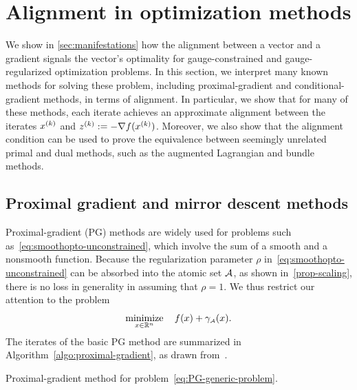 \section{Alignment in optimization methods} \label{sec:methods}

We show in \autoref{sec:manifestations} how the alignment between a vector and a
gradient signals the vector's optimality for gauge-constrained and
gauge-regularized optimization problems. In this section, we interpret many
known methods for solving these problem, including proximal-gradient and
conditional-gradient methods, in terms of alignment. In particular, we show that
for many of these methods, each iterate achieves an approximate alignment
between the iterates $x^{(k)}$ and $z^{(k)} := -\nabla f(x^{(k)})$. Moreover, we also show
that the alignment condition can be used to prove the equivalence between
seemingly unrelated primal and dual methods, such as the augmented Lagrangian
and bundle methods.

\subsection{Proximal gradient and mirror descent methods}

Proximal-gradient (PG) methods \cite{parikh2013proximal,teb97} are widely used
for problems such as~\eqref{eq:smoothopto-unconstrained}, which involve the sum
of a smooth and a nonsmooth function. Because the regularization  parameter
$\rho$ in~\eqref{eq:smoothopto-unconstrained} can be absorbed into the atomic
set $\mathcal{A}$, as shown in~\autoref{prop-scaling}, there is no loss in generality in
assuming that $\rho = 1$. We thus restrict our attention to the problem
\begin{equation} \label{eq:PG-generic-problem}
   \displaystyle\mathop{\hbox{\rm minimize}}_{x\in\mathbb{R}^n}\enspace\enspace f(x) + \gamma_{\scriptscriptstyle\mathcal{A}}(x).
\end{equation}
The iterates of the basic PG method are summarized in
Algorithm~\ref{algo:proximal-gradient}, as drawn
from~\citet[Section~4.2]{parikh2013proximal}.

\begin{algorithm}[t]
  \DontPrintSemicolon\setcounter{AlgoLine}{-1}
  \caption{Proximal-gradient method for problem~\eqref{eq:PG-generic-problem}.
  \label{algo:proximal-gradient}}
\end{algorithm}

